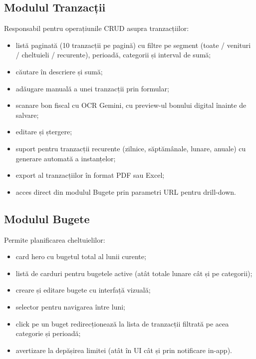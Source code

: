 \documentclass[12pt,a4paper,oneside]{report}
\begin{document}
\subsection*{Modulul Tranzacții}

Responsabil pentru operațiunile CRUD asupra tranzacțiilor:

\begin{itemize}[leftmargin=2cm,itemsep=2pt]
  \item listă paginată (10 tranzacții pe pagină) cu filtre pe segment (toate / venituri / cheltuieli / recurente), perioadă, categorii și interval de sumă;
  \item căutare în descriere și sumă;
  \item adăugare manuală a unei tranzacții prin formular;
  \item scanare bon fiscal cu OCR Gemini, cu preview-ul bonului digital înainte de salvare;
  \item editare și ștergere;
  \item suport pentru tranzacții recurente (zilnice, săptămânale, lunare, anuale) cu generare automată a instanțelor;
  \item export al tranzacțiilor în format PDF sau Excel;
  \item acces direct din modulul Bugete prin parametri URL pentru drill-down.
\end{itemize}

\subsection*{Modulul Bugete}

Permite planificarea cheltuielilor:

\begin{itemize}[leftmargin=2cm,itemsep=2pt]
  \item card hero cu bugetul total al lunii curente;
  \item listă de carduri pentru bugetele active (atât totale lunare cât și pe categorii);
  \item creare și editare bugete cu interfață vizuală;
  \item selector pentru navigarea între luni;
  \item click pe un buget redirecționează la lista de tranzacții filtrată pe acea categorie și perioadă;
  \item avertizare la depășirea limitei (atât în UI cât și prin notificare in-app).
\end{itemize}
\end{document}
